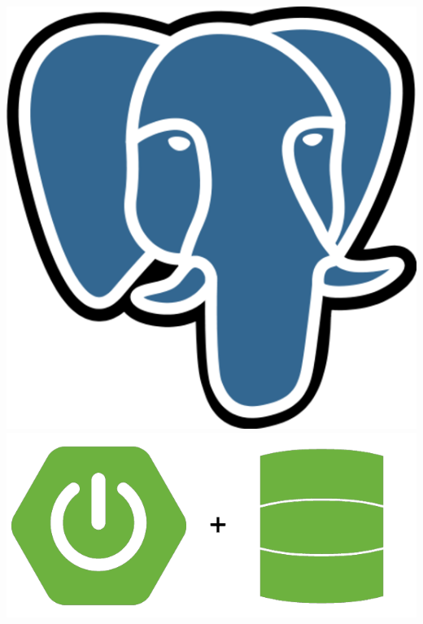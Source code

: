 \begin{frame}
\begin{minipage}{0.49\textwidth}
\begin{center}
\includegraphics[height=0.175\textheight]{postgres}\\[12pt]
\includegraphics[height=0.175\textheight]{springjpa}\\[12pt]
\end{center}
\end{minipage}
\end{frame}

